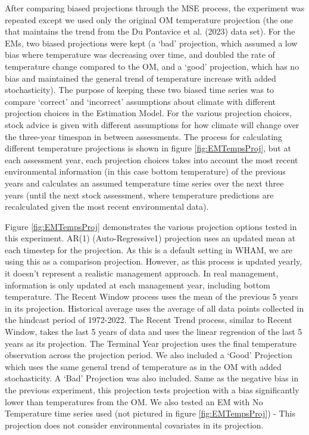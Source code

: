 \documentclass[
  12pt,
]{article}
\begin{document}
After comparing biased projections through the MSE process, the experiment was repeated except we used only the original OM temperature projection (the one that maintains the trend from the Du Pontavice et al. (2023) data set). For the EMs, two biased projections were kept (a `bad' projection, which assumed a low bias where temperature was decreasing over time, and doubled the rate of temperature change compared to the OM, and a `good' projection, which has no bias and maintained the general trend of temperature increase with added stochasticity). The purpose of keeping these two biased time series was to compare `correct' and `incorrect' assumptions about climate with different projection choices in the Estimation Model. For the various projection choices, stock advice is given with different assumptions for how climate will change over the three-year timespan in between assessments. The process for calculating different temperature projections is shown in figure \ref{fig:EMTempsProj}, but at each assessment year, each projection choices takes into account the most recent environmental information (in this case bottom temperature) of the previous years and calculates an assumed temperature time series over the next three years (until the next stock assessment, where temperature predictions are recalculated given the most recent environmental data).

Figure \ref{fig:EMTempsProj} demonstrates the various projection options tested in this experiment. AR(1) (Auto-Regressive1) projection uses an updated mean at each timestep for the projection. As this is a default setting in WHAM, we are using this as a comparison projection. However, as this process is updated yearly, it doesn't represent a realistic management approach. In real management, information is only updated at each management year, including bottom temperature. The Recent Window process uses the mean of the previous 5 years in its projection. Historical average uses the average of all data points collected in the hindcast period of 1972-2022. The Recent Trend process, similar to Recent Window, takes the last 5 years of data and uses the linear regression of the last 5 years as its projection. The Terminal Year projection uses the final temperature observation across the projection period. We also included a `Good' Projection which uses the same general trend of temperature as in the OM with added stochasticity. A `Bad' Projection was also included. Same as the negative bias in the previous experiment, this projection tests projection with a bias significantly lower than temperatures from the OM. We also tested an EM with No Temperature time series used (not pictured in figure \ref{fig:EMTempsProj}) - This projection does not consider environmental covariates in its projection.
\end{document}
